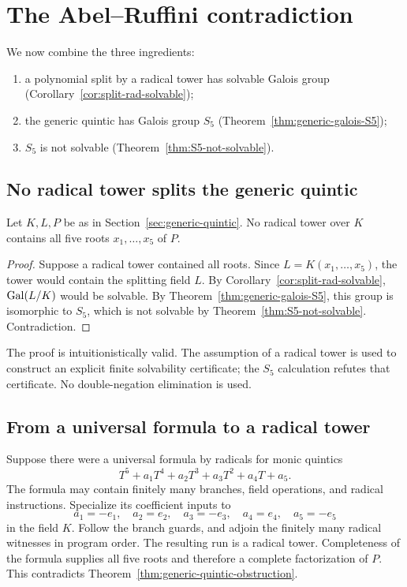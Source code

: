 \section{The Abel--Ruffini contradiction}
\label{sec:abel-proof}

We now combine the three ingredients:

\begin{enumerate}
\item a polynomial split by a radical tower has solvable Galois group
  (Corollary~\ref{cor:split-rad-solvable});
\item the generic quintic has Galois group $S_5$
  (Theorem~\ref{thm:generic-galois-S5});
\item $S_5$ is not solvable
  (Theorem~\ref{thm:S5-not-solvable}).
\end{enumerate}

\subsection{No radical tower splits the generic quintic}

\begin{theorem}
\label{thm:generic-quintic-obstruction}
Let $K,L,P$ be as in Section~\ref{sec:generic-quintic}.  No radical tower over
$K$ contains all five roots $x_1,\ldots,x_5$ of $P$.
\end{theorem}

\begin{proof}
Suppose a radical tower contained all roots.  Since $L=K(x_1,\ldots,x_5)$,
the tower would contain the splitting field $L$.  By
Corollary~\ref{cor:split-rad-solvable}, $\operatorname{Gal}(L/K)$ would be solvable.  By
Theorem~\ref{thm:generic-galois-S5}, this group is isomorphic to $S_5$, which
is not solvable by Theorem~\ref{thm:S5-not-solvable}.  Contradiction.
\end{proof}

The proof is intuitionistically valid.  The assumption of a radical tower is
used to construct an explicit finite solvability certificate; the $S_5$
calculation refutes that certificate.  No double-negation elimination is used.

\subsection{From a universal formula to a radical tower}

Suppose there were a universal formula by radicals for monic quintics
\[
 T^5+a_1T^4+a_2T^3+a_3T^2+a_4T+a_5.
\]
The formula may contain finitely many branches, field operations, and radical
instructions.  Specialize its coefficient inputs to
\[
 a_1=-e_1,
 \quad a_2=e_2,
 \quad a_3=-e_3,
 \quad a_4=e_4,
 \quad a_5=-e_5
\]
in the field $K$.  Follow the branch guards, and adjoin the finitely many
radical witnesses in program order.  The resulting run is a radical tower.
Completeness of the formula supplies all five roots and therefore a complete
factorization of $P$.  This contradicts
Theorem~\ref{thm:generic-quintic-obstruction}.

